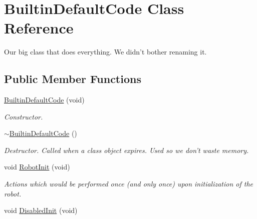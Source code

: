 \hypertarget{class_builtin_default_code}{
\section{BuiltinDefaultCode Class Reference}
\label{class_builtin_default_code}
}


Our big class that does everything. We didn't bother renaming it.  


\subsection*{Public Member Functions}
\begin{DoxyCompactItemize}
\item 
\hyperlink{class_builtin_default_code_a5f72b929d98fe4193e1a7d8e351a7837}{BuiltinDefaultCode} (void)
\begin{DoxyCompactList}\small\item\em Constructor. \item\end{DoxyCompactList}\item 
\hypertarget{class_builtin_default_code_a04c696dab5af274ca086d8903eb02134}{
\hyperlink{class_builtin_default_code_a04c696dab5af274ca086d8903eb02134}{$\sim$BuiltinDefaultCode} ()}
\label{class_builtin_default_code_a04c696dab5af274ca086d8903eb02134}

\begin{DoxyCompactList}\small\item\em Destructor. Called when a class object expires. Used so we don't waste memory. \item\end{DoxyCompactList}\item 
\hypertarget{class_builtin_default_code_a522b7e1b11f160868900a01a7f5609b6}{
void \hyperlink{class_builtin_default_code_a522b7e1b11f160868900a01a7f5609b6}{RobotInit} (void)}
\label{class_builtin_default_code_a522b7e1b11f160868900a01a7f5609b6}

\begin{DoxyCompactList}\small\item\em Actions which would be performed once (and only once) upon initialization of the robot. \item\end{DoxyCompactList}\item 
\hypertarget{class_builtin_default_code_a1df5e366a588086aedab2510393a9ac6}{
void \hyperlink{class_builtin_default_code_a1df5e366a588086aedab2510393a9ac6}{DisabledInit} (void)}
\label{class_builtin_default_code_a1df5e366a588086aedab2510393a9ac6}


\end{DoxyCompactItemize}
